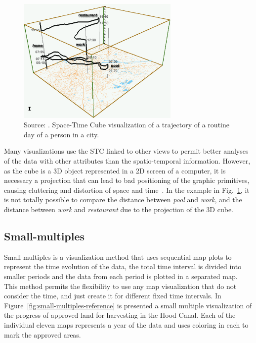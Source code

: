\begin{figure}
    \centering
    \includegraphics[width = 0.7\textwidth]{src/imgs/space-time-cube-reference.png}
    \caption{Source: \cite{Kraak2003Space}. Space-Time Cube visualization of a trajectory of a routine day of a person in a city.}
    \label{fig:space-time-cube-reference}
\end{figure}
%
Many visualizations use the STC linked to other views to permit better analyses of the data with other attributes than the spatio-temporal information.
%
However, as the cube is a 3D object represented in a 2D screen of a computer, it is necessary a projection that can lead to bad positioning of the graphic primitives, causing cluttering and distortion of space and time~\cite{andrienko2013visual}.
%
In the example in Fig.~\ref{fig:space-time-cube-reference}, it is not totally possible to compare the distance between \textit{pool} and \textit{work}, and the distance between \textit{work} and \textit{restaurant} due to the projection of the 3D cube.

\subsection{Small-multiples}

Small-multiples is a visualization method that uses sequential map plots to represent the time evolution of the data, the total time interval is divided into smaller periods and the data from each period is plotted in a separated map.
%
This method permits the flexibility to use any map visualization that do not consider the time, and just create it for different fixed time intervals.
%
In Figure~\ref{fig:small-multiples-reference} is presented a small multiple visualization of the progress of approved land for harvesting in the Hood Canal. 
%
Each of the individual eleven maps represents a year of the data and uses coloring in each to mark the approved areas.

